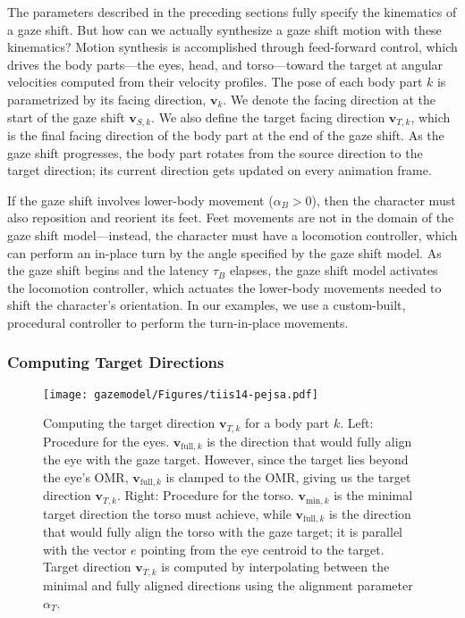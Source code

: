 The parameters described in the preceding sections fully specify the kinematics of a gaze shift. But how can we actually synthesize a gaze shift motion with these kinematics? Motion synthesis is accomplished through feed-forward control, which drives the body parts---the eyes, head, and torso---toward the target at angular velocities computed from their velocity profiles. The pose of each body part $k$ is parametrized by its facing direction, $\mathbf{v}_k$. We denote the facing direction at the start of the gaze shift $\mathbf{v}_{S,k}$. We also define the target facing direction $\mathbf{v}_{T,k}$, which is the final facing direction of the body part at the end of the gaze shift. As the gaze shift progresses, the body part rotates from the source direction to the target direction; its current direction gets updated on every animation frame.

If the gaze shift involves lower-body movement ($\alpha_B > 0$), then the character must also reposition and reorient its feet. Feet movements are not in the domain of the gaze shift model---instead, the character must have a locomotion controller, which can perform an in-place turn by the angle specified by the gaze shift model. As the gaze shift begins and the latency $\tau_B$ elapses, the gaze shift model activates the locomotion controller, which actuates the lower-body movements needed to shift the character's orientation. In our examples, we use a custom-built, procedural controller to perform the turn-in-place movements.

\subsubsection{Computing Target Directions}
\label{sec:GazeShiftTargetDirections}

\begin{figure}
\centering
\texttt{[image: gazemodel/Figures/tiis14-pejsa.pdf]}
\caption{Computing the target direction $\mathbf{v}_{T,k}$ for a body part $k$. Left: Procedure for the eyes. $\mathbf{v}_{\mathrm{full},k}$ is the direction that would fully align the eye with the gaze target. However, since the target lies beyond the eye's OMR, $\mathbf{v}_{\mathrm{full},k}$ is clamped to the OMR, giving us the target direction $\mathbf{v}_{T,k}$. Right: Procedure for the torso. $\mathbf{v}_{\mathrm{min},k}$ is the minimal target direction the torso must achieve, while $\mathbf{v}_{\mathrm{full},k}$ is the direction that would fully align the torso with the gaze target; it is parallel with the vector $e$ pointing from the eye centroid to the target. Target direction $\mathbf{v}_{T,k}$ is computed by interpolating between the minimal and fully aligned directions using the alignment parameter $\alpha_T$.}
\label{fig:GazeShiftTargetRot}
\end{figure}

